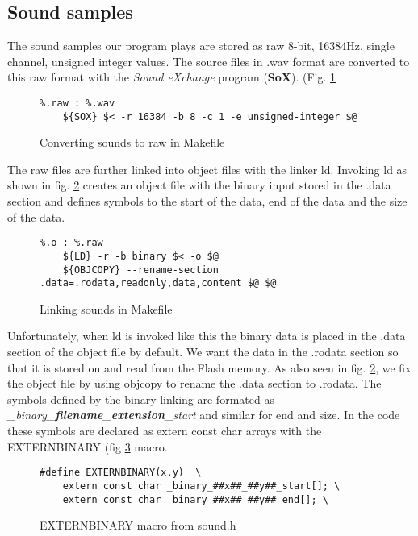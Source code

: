 \subsection{Sound samples}

The sound samples our program plays are stored as raw 8-bit, 16384Hz, single
channel, unsigned integer values. The source files in .wav format are converted
to this raw format with the \emph{Sound eXchange} program (\textbf{SoX}). (Fig.
\ref{Makefile:soundconvert}
\begin{figure}[h]
	\caption{Converting sounds to raw in Makefile}
	\label{Makefile:soundconvert}
	\begin{lstlisting}
%.raw : %.wav
	${SOX} $< -r 16384 -b 8 -c 1 -e unsigned-integer $@
	\end{lstlisting}
\end{figure}
The raw files are further linked into object files with the linker ld. Invoking
ld as shown in fig. \ref{Makefile:soundlink} creates an object file with the
binary input stored in the .data section and defines symbols to the start of the
data, end of the data and the size of the data.
\begin{figure}[h]
	\caption{Linking sounds in Makefile}
	\label{Makefile:soundlink}
	\begin{lstlisting}
%.o : %.raw
	${LD} -r -b binary $< -o $@
	${OBJCOPY} --rename-section .data=.rodata,readonly,data,content $@ $@
	\end{lstlisting}
\end{figure}
Unfortunately, when ld is invoked like this the binary data is placed in the
.data section of the object file by default. We want the data in the .rodata
section so that it is stored on and read from the Flash memory. As also seen in
fig. \ref{Makefile:soundlink}, we fix the object file by using objcopy to rename
the .data section to .rodata. The symbols defined by the binary linking are
formated as \emph{\_binary\_\textbf{filename}\_\textbf{extension}\_start} and
similar for end and size. In the code these symbols are declared as extern const
char arrays with the EXTERNBINARY (fig \ref{code:externbinary} macro.
\begin{figure}[h]
	\caption{EXTERNBINARY macro from sound.h}
	\label{code:externbinary}
	\begin{lstlisting}
#define EXTERNBINARY(x,y)  \
	extern const char _binary_##x##_##y##_start[]; \
	extern const char _binary_##x##_##y##_end[]; \
	\end{lstlisting}
\end{figure}

